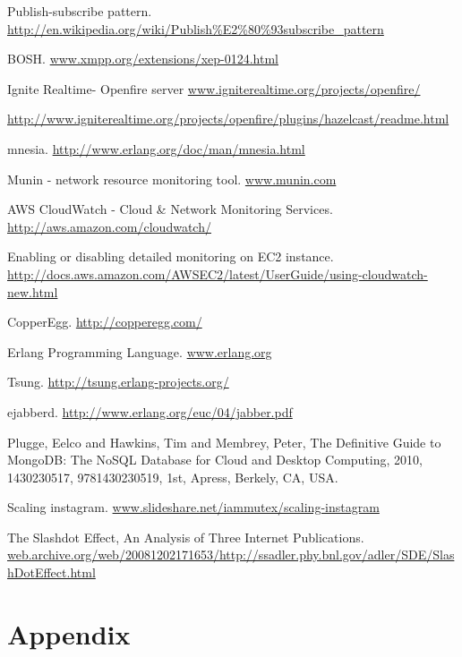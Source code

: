 \documentclass[a4paper, twocolumn]{article}
\begin{document}
\begin{thebibliography}{9}
	Publish-subscribe pattern. \url{http://en.wikipedia.org/wiki/Publish\%E2\%80\%93subscribe_pattern}
    
	BOSH. \url{www.xmpp.org/extensions/xep-0124.html}

	Ignite Realtime- Openfire server \url{www.igniterealtime.org/projects/openfire/}
   
	\url{http://www.igniterealtime.org/projects/openfire/plugins/hazelcast/readme.html}
    
mnesia. \url{http://www.erlang.org/doc/man/mnesia.html}

  Munin - network resource monitoring tool. \url{www.munin.com}
  
  AWS CloudWatch - Cloud \& Network Monitoring Services. \url{http://aws.amazon.com/cloudwatch/}
  
  Enabling or disabling detailed monitoring on EC2 instance. \url{http://docs.aws.amazon.com/AWSEC2/latest/UserGuide/using-cloudwatch-new.html}
  
  CopperEgg. \url{http://copperegg.com/}

	Erlang Programming Language. \url{www.erlang.org}

Tsung. \url{http://tsung.erlang-projects.org/}

 ejabberd. \url{http://www.erlang.org/euc/04/jabber.pdf}

 {Plugge, Eelco and Hawkins, Tim and Membrey, Peter},
 {The Definitive Guide to MongoDB: The NoSQL Database for Cloud and Desktop Computing},
 {2010},
 {1430230517, 9781430230519},
 {1st},
 {Apress},
 {Berkely, CA, USA}.

	Scaling instagram. \url{www.slideshare.net/iammutex/scaling-instagram}
    
	The Slashdot Effect, An Analysis of Three Internet Publications. \url{web.archive.org/web/20081202171653/http://ssadler.phy.bnl.gov/adler/SDE/SlashDotEffect.html}


\end{thebibliography}


\section{Appendix}
\end{document}
